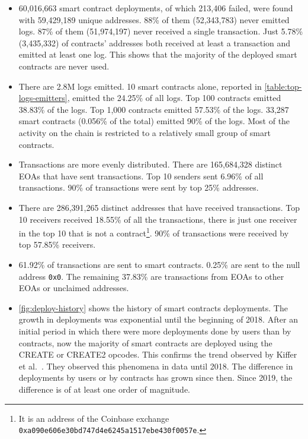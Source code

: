 \begin{itemize}
    \item 60,016,663 smart contract deployments, of which 213,406 failed, were found with 59,429,189 unique addresses. 88\% of them (52,343,783) never emitted logs. 87\% of them (51,974,197) never received a single transaction. Just 5.78\% (3,435,332) of contracts' addresses both received at least a transaction and emitted at least one log. This shows that the majority of the deployed smart contracts are never used.
    
    \item There are 2.8M logs emitted. 10 smart contracts alone, reported in \cref{table:top-logs-emitters}, emitted the 24.25\% of all logs. Top 100 contracts emitted 38.83\% of the logs. Top 1,000 contracts emitted 57.53\% of the logs. 33,287 smart contracts (0.056\% of the total) emitted 90\% of the logs. Most of the activity on the chain is restricted to a relatively small group of smart contracts.
    
    \item Transactions are more evenly distributed. There are 165,684,328 distinct EOAs that have sent transactions. Top 10 senders sent 6.96\% of all transactions. 90\% of transactions were sent by top 25\% addresses. 
    
    \item There are 286,391,265 distinct addresses that have received transactions. Top 10 receivers received 18.55\% of all the transactions, there is just one receiver in the top 10 that is not a contract\footnote{It is an address of the Coinbase exchange {\tt 0xa090e606e30bd747d4e6245a1517ebe430f0057e}.}. 90\% of transactions were received by top 57.85\% receivers.
    
    \item 61.92\% of transactions are sent to smart contracts. 0.25\% are sent to the null address {\tt 0x0}. The remaining 37.83\% are transactions from EOAs to other EOAs or unclaimed addresses.
    
    \item \cref{fig:deploy-history} shows the history of smart contracts deployments. The growth in deployments was exponential until the beginning of 2018. After an initial period in which there were more deployments done by users than by contracts, now the majority of smart contracts are deployed using the CREATE or CREATE2 opcodes. This confirms the trend observed by Kiffer et al.~\cite{ethereum-sc-topology}. They observed this phenomena in data until 2018. The difference in deployments by users or by contracts has grown since then. Since 2019, the difference is of at least one order of magnitude.
\end{itemize}

